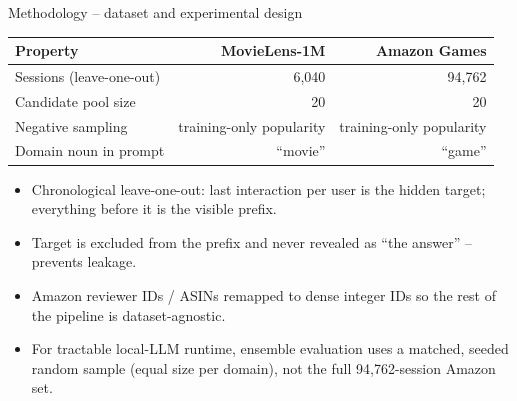 \documentclass[aspectratio=169,12pt]{beamer}
\begin{document}
\begin{frame}{Methodology -- dataset and experimental design}
\begin{table}
\centering
\small
\begin{tabular}{lrr}
\toprule
\textbf{Property} & \textbf{MovieLens-1M} & \textbf{Amazon Games}\\
\midrule
Sessions (leave-one-out) & 6{,}040 & 94{,}762\\
Candidate pool size & 20 & 20\\
Negative sampling & training-only popularity & training-only popularity\\
Domain noun in prompt & ``movie'' & ``game''\\
\bottomrule
\end{tabular}
\end{table}

\begin{itemize}
  \item Chronological leave-one-out: last interaction per user is the
        hidden target; everything before it is the visible prefix.
  \item Target is excluded from the prefix and never revealed as ``the
        answer'' -- prevents leakage.
  \item Amazon reviewer IDs / ASINs remapped to dense integer IDs so the
        rest of the pipeline is dataset-agnostic.
  \item For tractable local-LLM runtime, ensemble evaluation uses a
        matched, seeded random sample (equal size per domain), not the
        full 94{,}762-session Amazon set.
\end{itemize}
\end{frame}
\end{document}
